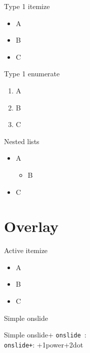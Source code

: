 \documentclass[
 size=12pt,
 paper=smartboard, %
 mode=present, %
 display=slides, %
style=tuliplab,
pauseslide,
fleqn,leqno]{powerdot}
\begin{document}
\begin{slide}{Type 1 itemize}
\begin{itemize}[type=1]
\item A \pause
\item B \pause
\item C
\end{itemize}
\end{slide}

\begin{slide}{Type 1 enumerate}
\begin{enumerate}[type=1]%
\item A \pause
\item B \pause
\item C
\end{enumerate}
\end{slide}


\begin{slide}{Nested lists}
\begin{itemize}
\item A\pause
\begin{itemize}[type=1]
\item B\pause
\end{itemize}
\item C
\end{itemize}
\end{slide}

\section{Overlay}

\begin{slide}{Active itemize}
\begin{itemize}[type=1]
\item<1> A
\item<2> B
\item<3> C
\end{itemize}
\end{slide}

\begin{slide}{Simple onslide}
\end{slide}

\begin{slide}{Simple onslide+}
\texttt{onslide }: \\
\texttt{onslide+}: \onslide+{1}{power}\onslide+{2}{dot}
\end{slide}
\end{document}
